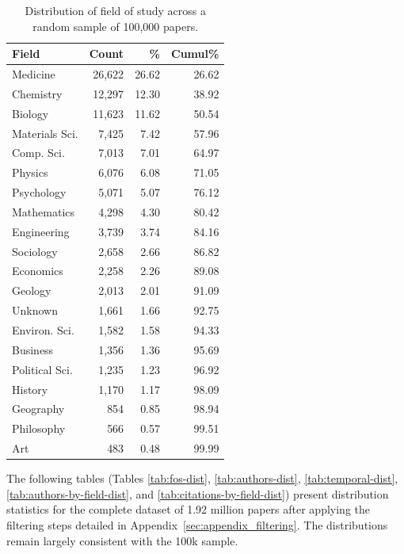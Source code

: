 \documentclass[11pt]{article}
\begin{document}
\begin{table}[htbp]
\centering

\begin{tabular}{lrrr}
\toprule
\textbf{Field} & \textbf{Count} & \% & \textbf{Cumul}\% \\
\midrule
Medicine & 26,622 & 26.62 & 26.62 \\
Chemistry & 12,297 & 12.30 & 38.92 \\
Biology & 11,623 & 11.62 & 50.54 \\
Materials Sci. & 7,425 & 7.42 & 57.96 \\
Comp. Sci. & 7,013 & 7.01 & 64.97 \\
Physics & 6,076 & 6.08 & 71.05 \\
Psychology & 5,071 & 5.07 & 76.12 \\
Mathematics & 4,298 & 4.30 & 80.42 \\
Engineering & 3,739 & 3.74 & 84.16 \\
Sociology & 2,658 & 2.66 & 86.82 \\
Economics & 2,258 & 2.26 & 89.08 \\
Geology & 2,013 & 2.01 & 91.09 \\
Unknown & 1,661 & 1.66 & 92.75 \\
Environ. Sci. & 1,582 & 1.58 & 94.33 \\
Business & 1,356 & 1.36 & 95.69 \\
Political Sci. & 1,235 & 1.23 & 96.92 \\
History & 1,170 & 1.17 & 98.09 \\
Geography & 854 & 0.85 & 98.94 \\
Philosophy & 566 & 0.57 & 99.51 \\
Art & 483 & 0.48 & 99.99 \\
\bottomrule
\end{tabular}
\caption{Distribution of field of study across a random sample of 100,000 papers.}
\label{tab:fos-dist-sampled}
\end{table}

The following tables (Tables \ref{tab:fos-dist}, \ref{tab:authors-dist}, \ref{tab:temporal-dist}, \ref{tab:authors-by-field-dist}, and \ref{tab:citations-by-field-dist}) present distribution statistics for the complete dataset of 1.92 million papers after applying the filtering steps detailed in Appendix~\ref{sec:appendix_filtering}. The distributions remain largely consistent with the 100k sample.
\end{document}
